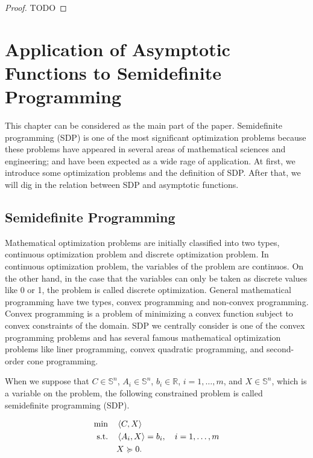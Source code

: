 \documentclass[a4paper,11pt, oneside]{book}
\theoremstyle{definition}
\newcommand{\RealNumberSet}{\mathbb{R}}
\newcommand{\NDemenstionalRealSymmetricMatrixSpace}{\mathbb{S}^n}
\newcommand{\InnerProduct}[2]{\left\langle {#1},{#2}\right\rangle} %
\begin{document}
\begin{proof}
  TODO
\end{proof}

\chapter{Application of Asymptotic Functions to Semidefinite Programming}

This chapter can be considered as the main part of the paper. Semidefinite programming (SDP) is one of the most significant optimization problems because these problems have appeared in several areas of mathematical sciences and engineering; and have been expected as a wide rage of application. At first, we introduce some optimization problems and the definition of SDP. After that, we will dig in the relation between SDP and asymptotic functions.

\section{Semidefinite Programming}

Mathematical optimization problems are initially classified into two types, continuous optimization problem and discrete optimization problem. In continuous optimization problem, the variables of the problem are continuos. On the other hand, in the case that the variables can only be taken as discrete values like 0 or 1, the problem is called discrete optimization. General mathematical programming have twe types, convex programming and non-convex programming. Convex programming is a problem of minimizing a convex function subject to convex constraints of the domain. SDP we centrally consider is one of the convex programming problems and has several famous mathematical optimization problems like liner programming, convex quadratic programming, and second-order cone programming.

When we suppose that $C \in \NDemenstionalRealSymmetricMatrixSpace$, $A_i \in \NDemenstionalRealSymmetricMatrixSpace$, $b_i \in \RealNumberSet$, $i = 1,\dots,m$, and $X \in \NDemenstionalRealSymmetricMatrixSpace$, which is a variable on the problem, the following constrained problem is called semidefinite programming (SDP).

\begin{equation}
  \begin{aligned}
  \min \quad & \InnerProduct{C}{X}\\
  \textrm{s.t.} \quad & \InnerProduct{A_i}{X} = b_i, \quad i = 1,\dots,m\\
    & X \succcurlyeq 0. \\ \notag
  \end{aligned}
\end{equation}
\end{document}
